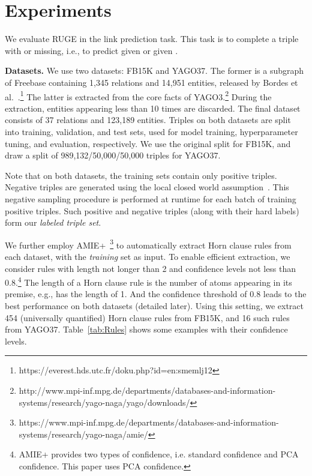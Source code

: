 \documentclass[letterpaper]{article} \usepackage{aaai18}  \usepackage{times}  \usepackage{helvet}  \usepackage{courier}  \usepackage{url}  \usepackage{graphicx}  \usepackage{amsmath}
\begin{document}
\section{Experiments}
We evaluate RUGE in the link prediction task. This task is to complete a triple  with  or  missing, i.e., to predict  given  or  given .

\smallskip
\noindent\textbf{Datasets.} We use two datasets: FB15K and YAGO37. The former is a subgraph of Freebase containing 1,345 relations and 14,951 entities, released by Bordes et al.~.\footnote{https://everest.hds.utc.fr/doku.php?id=en:smemlj12} The latter is extracted from the core facts of YAGO3.\footnote{http://www.mpi-inf.mpg.de/departments/databases-and-information-systems/research/yago-naga/yago/downloads/} During the extraction, entities appearing less than 10 times are discarded. The final dataset consists of 37 relations and 123,189 entities. Triples on both datasets are split into training, validation, and test sets, used for model training, hyperparameter tuning, and evaluation, respectively. We use the original split for FB15K, and draw a split of 989,132/50,000/50,000 triples for YAGO37.

Note that on both datasets, the training sets contain only positive triples. Negative triples are generated using the local closed world assumption~\cite{dong2014:KnowledgeVault}. This negative sampling procedure is performed at runtime for each batch of training positive triples. Such positive and negative triples (along with their hard labels) form our \textit{labeled triple set}.

We further employ AMIE+~\cite{galarraga2015:AMIE+}\footnote{https://www.mpi-inf.mpg.de/departments/databases-and-information-systems/research/yago-naga/amie/} to automatically extract Horn clause rules from each dataset, with the \textit{training} set as input. To enable efficient extraction, we consider rules with length not longer than 2 and confidence levels not less than 0.8.\footnote{AMIE+ provides two types of confidence, i.e. standard confidence and PCA confidence. This paper uses PCA confidence.} The length of a Horn clause rule is the number of atoms appearing in its premise, e.g.,   has the length of 1. And the confidence threshold of 0.8 leads to the best performance on both datasets (detailed later). Using this setting, we extract 454 (universally quantified) Horn clause rules from FB15K, and 16 such rules from YAGO37. Table~\ref{tab:Rules} shows some examples with their confidence levels.
\end{document}
